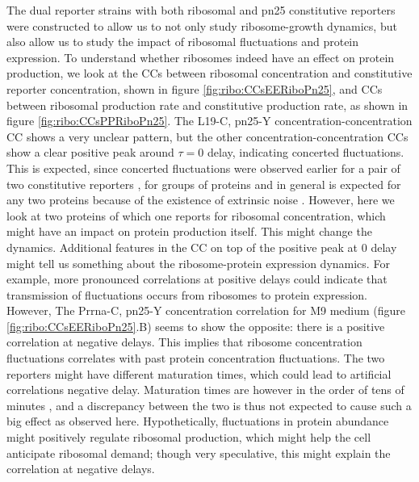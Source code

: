 The dual reporter strains with both ribosomal and pn25 constitutive reporters were constructed to allow us to not only study ribosome-growth dynamics, but also allow us to study the impact of ribosomal fluctuations and protein expression.
%
To understand whether ribosomes indeed have an effect on protein production, we look at the CCs between ribosomal concentration and constitutive reporter concentration, shown in figure \ref{fig:ribo:CCsEERiboPn25}, and CCs between ribosomal production rate and constitutive production rate, as shown in figure \ref{fig:ribo:CCsPPRiboPn25}.
%
The L19-C, pn25-Y concentration-concentration CC shows a very unclear pattern, 
but the other concentration-concentration CCs show a clear positive peak around $\tau = 0$ delay, indicating concerted fluctuations.
%
This is expected, since concerted fluctuations were observed earlier for a pair of two constitutive reporters \cite{Elowitz2002}, for groups of proteins \cite{Stewart-Ornstein2012} and in general is expected for any two proteins because of the existence of extrinsic noise \cite{Chalancon2012}.
%
However, here we look at two proteins of which one reports for ribosomal concentration, which might have an impact on protein production itself.
This might change the dynamics.
%
Additional features in the CC on top of the positive peak at 0 delay might tell us something about the ribosome-protein expression dynamics.
For example, more pronounced correlations at positive delays could indicate that transmission of fluctuations occurs from ribosomes to protein expression.
%
However, The Prrna-C, pn25-Y concentration correlation for M9 medium (figure \ref{fig:ribo:CCsEERiboPn25}.B) seems to show the opposite: there is a positive correlation at negative delays.
This implies that ribosome concentration fluctuations correlates with past protein concentration fluctuations.
%
The two reporters might have different maturation times, which could lead to artificial correlations negative delay.
%
Maturation times are however in the order of tens of minutes \cite{Iizuka2011, Walker2016t}, and a discrepancy between the two is thus not expected to cause such a big effect as observed here.
%
Hypothetically, %
fluctuations in protein abundance might positively regulate ribosomal production,
which might help the cell anticipate ribosomal demand;
though very speculative, 
this might explain the correlation at negative delays.

